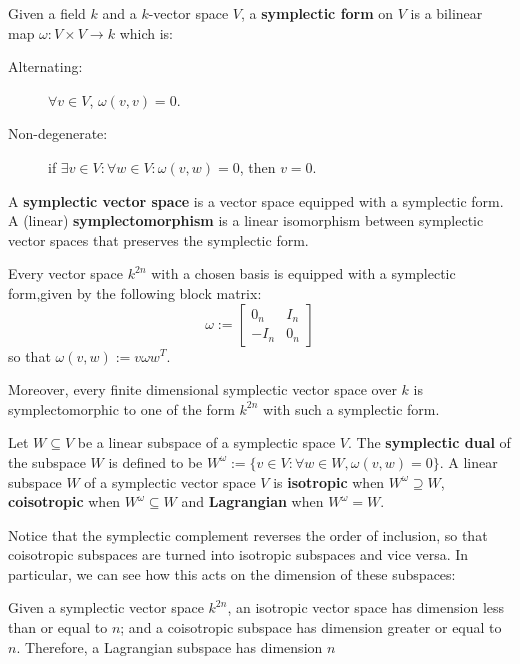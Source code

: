 \begin{definition}
  Given a field  $k$ and a $k$-vector space $V$, a {\bf symplectic form} on $V$ is a bilinear map $\omega:V\times V\to k$ which is:
\begin{description}
 \item[Alternating:] $\forall v \in V$, $\omega(v,v)=0$.
 \item[Non-degenerate:] if $\exists v \in V: \forall w \in V: \omega(v,w)=0$, then $v=0$.
\end{description}
  A {\bf symplectic vector space} is a vector space equipped with a symplectic form. A (linear) {\bf symplectomorphism} is a linear isomorphism between symplectic vector spaces that preserves the symplectic form.
\end{definition}


\begin{lemma}
\label{lemma:sform}
Every vector space $k^{2n}$ with a chosen basis is equipped with a symplectic form,given by the following block matrix:
$$
\omega:=
\begin{bmatrix}
0_n & I_n\\
-I_n & 0_n
\end{bmatrix}
$$
so that $\omega(v,w) := v \omega w^T$.

Moreover, every finite dimensional symplectic vector space over $k$ is symplectomorphic to one of the form $k^{2n}$ with such a symplectic form.
\end{lemma}


\begin{definition}

Let $W \subseteq V$ be a linear subspace of a symplectic space $V$.
The {\bf symplectic dual} of the subspace $W$ is defined to be
$
W^\omega:= \{v \in V : \forall w \in W, \omega(v,w)=0 \}
$.
A linear subspace  $W$ of a symplectic vector space $V$ is {\bf isotropic} when $W^\omega \supseteq W$, {\bf coisotropic} when $W^\omega \subseteq W$ and {\bf Lagrangian} when $W^\omega=W$.
\end{definition}

Notice that the symplectic complement reverses the order of inclusion, so that coisotropic subspaces are turned into isotropic subspaces and vice versa.  In particular, we can see how this acts on the dimension of these subspaces:


\begin{lemma}
Given a symplectic vector space $k^{2n}$, an isotropic vector space has dimension less than or equal to $n$; and a coisotropic subspace has dimension greater or equal to $n$.  Therefore, a Lagrangian subspace has dimension $n$
\end{lemma}


